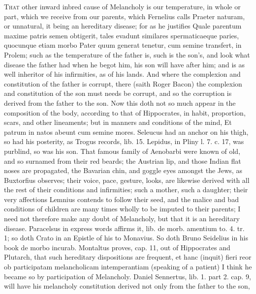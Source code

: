 {{\lettrine{T}{hat} other inward inbred cause of Melancholy is our temperature, in
whole or part, which we receive from our parents, which Fernelius
calls Praeter naturam, or unnatural, it being an hereditary disease;
for as he justifies Quale parentum maxime patris semen obtigerit,
tales evadunt similares spermaticaeque paries, quocunque etiam morbo
Pater quum generat tenetur, cum semine transfert, in Prolem; such as
the temperature of the father is, such is the son's, and look what
disease the father had when he begot him, his son will have after him;
and is as well inheritor of his infirmities, as of his lands. And
where the complexion and constitution of the father is corrupt, there
(saith Roger Bacon) the complexion and constitution of the son
must needs be corrupt, and so the corruption is derived from the father
to the son. Now this doth not so much appear in the composition of the
body, according to that of Hippocrates, in habit, proportion,
scars, and other lineaments; but in manners and conditions of the mind,
Et patrum in natos abeunt cum semine mores.
Seleucus had an anchor on his thigh, so had his posterity, as Trogus
records, lib. 15. Lepidus, in Pliny l. 7. c. 17, was purblind, so was
his son. That famous family of Aenobarbi were known of old, and so
surnamed from their red beards; the Austrian lip, and those Indian flat
noses are propagated, the Bavarian chin, and goggle eyes amongst the
Jews, as Buxtorfius observes; their voice, pace, gesture, looks,
are likewise derived with all the rest of their conditions and
infirmities; such a mother, such a daughter; their very
affections Lemnius contends to follow their seed, and the malice
and bad conditions of children are many times wholly to be imputed to
their parents; I need not therefore make any doubt of Melancholy, but
that it is an hereditary disease.  Paracelsus in express words
affirms it, lib. de morb. amentium to. 4. tr. 1; so doth Crato in
an Epistle of his to Monavius. So doth Bruno Seidelius in his book de
morbo incurab. Montaltus proves, cap. 11, out of Hippocrates and
Plutarch, that such hereditary dispositions are frequent, et hanc
(inquit) fieri reor ob participatam melancholicam intemperantiam
(speaking of a patient) I think he became so by participation of
Melancholy. Daniel Sennertus, lib. 1. part 2. cap. 9, will have his
melancholy constitution derived not only from the father to the son,
}}

